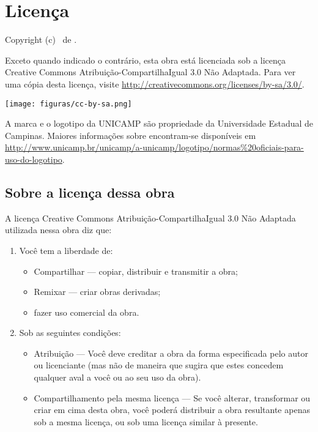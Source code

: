 \chapter{Licença}
Copyright (c) \ano \ de \autor.

Exceto quando indicado o contrário, esta obra está licenciada sob a licença
Creative Commons Atribuição-CompartilhaIgual 3.0 Não Adaptada. Para ver uma
cópia desta licença, visite
\url{http://creativecommons.org/licenses/by-sa/3.0/}.

\begin{center}
  \texttt{[image: figuras/cc-by-sa.png]}
\end{center}


A marca e o logotipo da UNICAMP são propriedade da Universidade Estadual de
Campinas. Maiores informações sobre encontram-se disponíveis em
\url{http://www.unicamp.br/unicamp/a-unicamp/logotipo/normas%20oficiais-para-uso-do-logotipo}.

\section{Sobre a licença dessa obra}
A licença Creative Commons Atribuição-CompartilhaIgual 3.0 Não Adaptada
utilizada nessa obra diz que:
\begin{enumerate}
  \item Você tem a liberdade de:
    \begin{itemize}
      \item Compartilhar — copiar, distribuir e transmitir a obra;
      \item Remixar — criar obras derivadas;
      \item fazer uso comercial da obra.
    \end{itemize}
  \item Sob as seguintes condições:
    \begin{itemize}
      \item Atribuição — Você deve creditar a obra da forma especificada pelo
        autor ou licenciante (mas não de maneira que sugira que estes concedem
        qualquer aval a você ou ao seu uso da obra).
      \item Compartilhamento pela mesma licença — Se você alterar, transformar
        ou criar em cima desta obra, você poderá distribuir a obra resultante
        apenas sob a mesma licença, ou sob uma licença similar à presente.
    \end{itemize}
\end{enumerate}